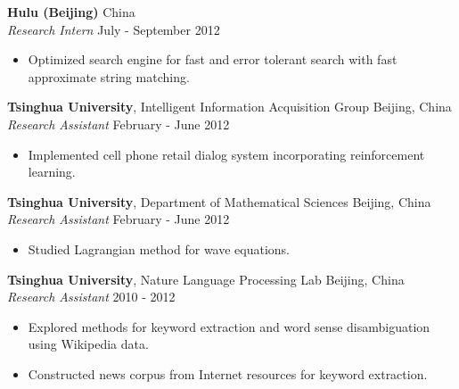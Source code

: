 \documentclass[a4paper,11pt]{article} %
\begin{document}

\textbf{Hulu (Beijing)} \hfill China \\
\textit{Research Intern} \hfill July - September 2012
\vspace{-.9\parskip}
\begin{itemize}
  \item Optimized search engine for fast and error tolerant search with fast approximate string matching.
\end{itemize}


\iffalse

\textbf{Tsinghua University}, Intelligent Information Acquisition Group \hfill Beijing, China \\
\textit{Research Assistant} \hfill February - June 2012
\vspace{-\parskip}
\begin{itemize}
  \item Implemented cell phone retail dialog system incorporating reinforcement learning.
\end{itemize}


\textbf{Tsinghua University}, Department of Mathematical Sciences \hfill Beijing, China \\
\textit{Research Assistant} \hfill February - June 2012
\vspace{-\parskip}
\begin{itemize}
  \item Studied Lagrangian method for wave equations.
\end{itemize}


\textbf{Tsinghua University}, Nature Language Processing Lab \hfill Beijing, China \\
\textit{Research Assistant} \hfill 2010 - 2012
\vspace{-\parskip}
\begin{itemize}
  \item Explored methods for keyword extraction and word sense disambiguation using Wikipedia data.
  \item Constructed news corpus from Internet resources for keyword extraction.
\end{itemize}
\end{document}
